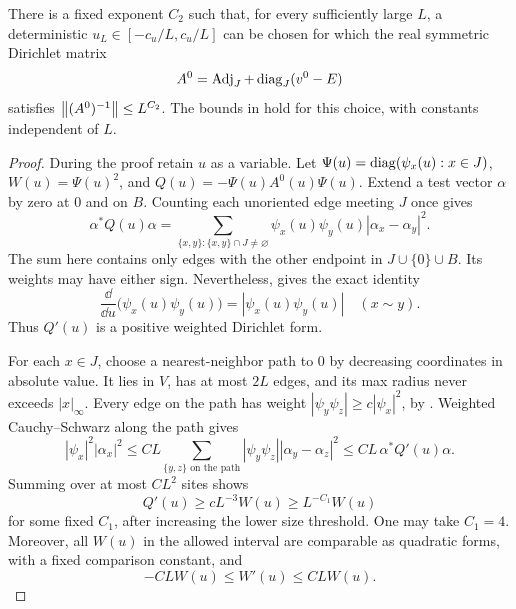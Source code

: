 \begin{lemma}\label{cell:profile}
There is a fixed exponent $C_2$ such that, for every sufficiently large
$L$, a deterministic $u_L\in[-c_u/L,c_u/L]$ can be chosen for which
the real symmetric Dirichlet matrix
\[
 A^0=\operatorname{Adj}_J+\operatorname{diag}_J(v^0-E)
\]
satisfies $\left\lVert(A^0)^{-1}\right\rVert\le L^{C_2}$.  The bounds in
 hold for this
choice, with constants independent of $L$.
\end{lemma}

\begin{proof}
During the proof retain $u$ as a variable.  Let
$\Psi(u)=\operatorname{diag}(\psi_x(u):x\in J)$, $W(u)=\Psi(u)^2$, and
$Q(u)=-\Psi(u)A^0(u)\Psi(u)$.  Extend a test vector $\alpha$ by zero
at $0$ and on $B$.  Counting each unoriented edge meeting $J$ once gives
\begin{equation}
 \alpha^*Q(u)\alpha
 =\sum_{\{x,y\}:\{x,y\}\cap J\ne\varnothing}
       \psi_x(u)\psi_y(u)|\alpha_x-\alpha_y|^2.
 \label{cell:weighted-form}
\end{equation}
The sum here contains only edges with the other endpoint in $J\cup\{0\}
\cup B$.  Its weights may have either sign.  Nevertheless,
 gives the exact identity
\[
 \frac{\dd}{\dd u}\bigl(\psi_x(u)\psi_y(u)\bigr)
       =|\psi_x(u)\psi_y(u)|
       \quad(x\sim y).
\]
Thus $Q'(u)$ is a positive weighted Dirichlet form.

For each $x\in J$, choose a nearest-neighbor path to $0$ by decreasing
coordinates in absolute value.  It lies in $V$, has at most $2L$ edges,
and its max radius never exceeds $|x|_\infty$.  Every edge on the path
has weight $|\psi_y\psi_z|\ge c|\psi_x|^2$, by
.  Weighted Cauchy--Schwarz along the path gives
\[
 |\psi_x|^2|\alpha_x|^2
 \le CL\sum_{\{y,z\}\text{ on the path}}
                  |\psi_y\psi_z||\alpha_y-\alpha_z|^2
 \le CL\,\alpha^*Q'(u)\alpha.
\]
Summing over at most $C L^2$ sites shows
\begin{equation}
 Q'(u)\ge cL^{-3}W(u)\ge L^{-C_1}W(u)
 \label{cell:form-monotonicity}
\end{equation}
for some fixed $C_1$, after increasing the lower size threshold.  One may
take $C_1=4$.  Moreover, all $W(u)$ in the allowed interval are comparable
as quadratic forms, with a fixed comparison constant, and
\[
 -CLW(u)\le W'(u)\le CLW(u).
\]


\end{proof}
